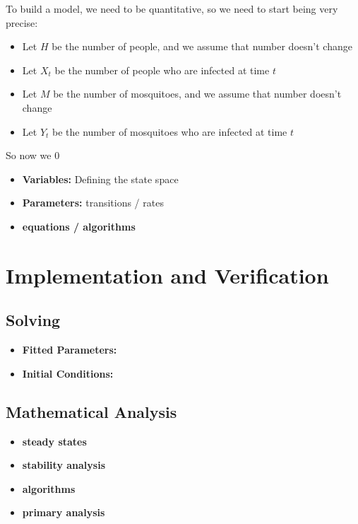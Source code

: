 \documentclass[
]{book}
\begin{document}
To build a model, we need to be quantitative, so we need to start being very precise:

\begin{itemize}
\item
  Let \(H\) be the number of people, and we assume that number doesn't change
\item
  Let \(X_t\) be the number of people who are infected at time \(t\)
\item
  Let \(M\) be the number of mosquitoes, and we assume that number doesn't change
\item
  Let \(Y_t\) be the number of mosquitoes who are infected at time \(t\)
\end{itemize}

So now we 0

\begin{itemize}
\item
  \textbf{Variables:} Defining the state space
\item
  \textbf{Parameters:} transitions / rates
\item
  \textbf{equations / algorithms}
\end{itemize}

\hypertarget{implementation-and-verification}{%
\section{Implementation and Verification}\label{implementation-and-verification}}

\hypertarget{solving-1}{%
\subsection{Solving}\label{solving-1}}

\begin{itemize}
\item
  \textbf{Fitted Parameters:}
\item
  \textbf{Initial Conditions:}
\end{itemize}

\hypertarget{mathematical-analysis}{%
\subsection{Mathematical Analysis}\label{mathematical-analysis}}

\begin{itemize}
\item
  \textbf{steady states}
\item
  \textbf{stability analysis}
\item
  \textbf{algorithms}
\item
  \textbf{primary analysis}
\end{itemize}
\end{document}
